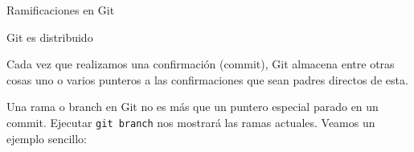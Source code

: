 \begin{frame}[t]{Ramificaciones en Git}

    Git es distribuido

    Cada vez que realizamos una confirmación (commit), Git almacena entre otras cosas uno o varios punteros a las confirmaciones que
    sean padres directos de esta.

    Una rama o branch en Git no es más que un puntero especial parado en un commit. Ejecutar \texttt{git branch} nos mostrará las ramas actuales. Veamos un ejemplo sencillo:



\end{frame}

